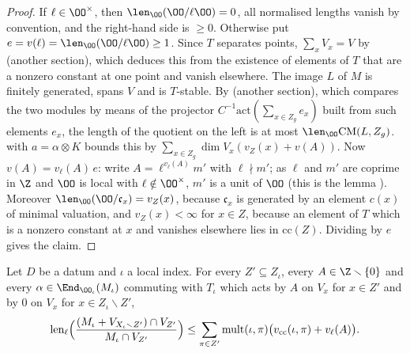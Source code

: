 \begin{proof}
If $\ell\in\OO^\times$, then $\len_\OO(\OO/\ell\OO)=0$, all normalised lengths vanish by convention, and the right-hand side is
$\ge0$. Otherwise put $e=v(\ell)=\len_\OO(\OO/\ell\OO)\ge1$. Since $T$ separates points, $\sum_xV_x=V$ by
 (another section), which deduces this from the existence of
elements of $T$ that are a nonzero constant at one point and vanish elsewhere. The image $L$ of $M$ is finitely generated, spans $V$ and is
$T$-stable. By  (another section), which compares the two
modules by means of the projector $C^{-1}\mathrm{act}(\sum_{x\in Z_g}e_x)$ built from such elements $e_x$, the length of the quotient on the
left is at most $\len_\OO\mathrm{CM}(L,Z_g)$.  with $a=\alpha\otimes K$ bounds this by
$\sum_{x\in Z_g}\dim V_x(v_Z(x)+v(A))$. Now $v(A)=v_\ell(A)\,e$: write $A=\ell^{v_\ell(A)}m'$ with $\ell\nmid m'$; as $\ell$ and $m'$ are
coprime in $\Z$ and $\OO$ is local with $\ell\notin\OO^\times$, $m'$ is a unit of $\OO$ (this is the lemma
). Moreover $\len_\OO(\OO/\mathfrak c_x)=v_Z(x)$, because
$\mathfrak c_x$ is generated by an element $c(x)$ of minimal valuation, and $v_Z(x)<\infty$ for $x\in Z$, because an element of $T$ which is a
nonzero constant at $x$ and vanishes elsewhere lies in $\mathrm{cc}(Z)$. Dividing by $e$ gives the claim.
\end{proof}

\begin{corollary}\label{pf:linkN-sel:eib}
Let $D$ be a datum and $\iota$ a local index. For every $Z'\subseteq Z_\iota$, every $A\in\Z\smallsetminus\{0\}$ and every
$\alpha\in\End_{\OO_\iota}(M_\iota)$ commuting with $T_\iota$ which acts by $A$ on $V_x$ for $x\in Z'$ and by $0$ on $V_x$ for
$x\in Z_\iota\smallsetminus Z'$,
\[
\operatorname{len}_{\ell}\Bigl(\frac{(M_\iota+V_{X_\iota\smallsetminus Z'})\cap V_{Z'}}{M_\iota\cap V_{Z'}}\Bigr)\le\sum_{\pi\in Z'}
\mathrm{mult}(\iota,\pi)\bigl(v_{\mathrm{cc}}(\iota,\pi)+v_\ell(A)\bigr).
\]
\end{corollary}

